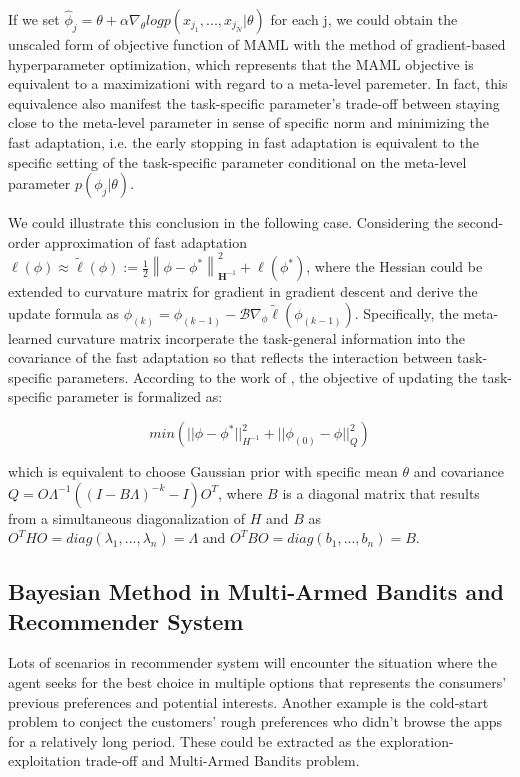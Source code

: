\documentclass{article}
\begin{document}
If we set $\hat{\phi}_j = \mathcal{\theta} + \alpha \nabla_{\mathcal{\theta}} logp(x_{j_1},...,x_{j_N} | \mathcal{\theta})$ for each j, we could obtain the unscaled form of objective function of MAML with the method of gradient-based hyperparameter optimization, which represents that the MAML objective is equivalent to a maximizationi with regard to a meta-level paremeter. In fact, this equivalence also manifest the task-specific parameter's trade-off between staying close to the meta-level parameter in sense of specific norm and minimizing the fast adaptation, i.e. the early stopping in fast adaptation is equivalent to the specific setting of the task-specific parameter conditional on the meta-level parameter $p(\phi_j | \theta)$.

We could illustrate this conclusion in the following case. Considering the second-order approximation of fast adaptation $\ell(\phi) \approx \tilde{\ell}(\phi):=\frac{1}{2}\left\|\phi-\phi^{*}\right\|_{\mathbf{H}^{-1}}^{2}+\ell\left(\phi^{*}\right)$, where the Hessian could be extended to curvature matrix for gradient in gradient descent and derive the update formula as $\phi_{(k)}=\phi_{(k-1)}-\mathcal{B} \nabla_{\phi} \tilde{\ell}\left(\phi_{(k-1)}\right)$. Specifically, the meta-learned curvature matrix incorperate the task-general information into the covariance of the fast adaptation so that reflects the interaction between task-specific parameters. According to the work of \cite{MLHB}, the objective of updating the task-specific parameter is formalized as:

\begin{equation}
  min(|| \phi - \phi^* ||_{H^{-1}}^2 + ||\phi_{(0)} -\phi||_Q^2)
\end{equation}

which is equivalent to choose Gaussian prior with specific mean $\theta$ and covariance $Q = O \varLambda^{-1} ((I - B \varLambda)^{-k} - I) O^T$, where $B$ is a diagonal matrix that results from a simultaneous diagonalization of $H$ and $B$ as $O^T H O = diag(\lambda_1,...,\lambda_n) = \varLambda$ and $O^T B O = diag(b_1,...,b_n) = B$. 

\subsection{Bayesian Method in Multi-Armed Bandits and Recommender System}

Lots of scenarios in recommender system will encounter the situation where the agent seeks for the best choice in multiple options that represents the consumers' previous preferences and potential interests. Another example is the cold-start problem to conject the customers' rough preferences who didn't browse the apps for a relatively long period. These could be extracted as the exploration-exploitation trade-off and Multi-Armed Bandits problem. 
\end{document}
